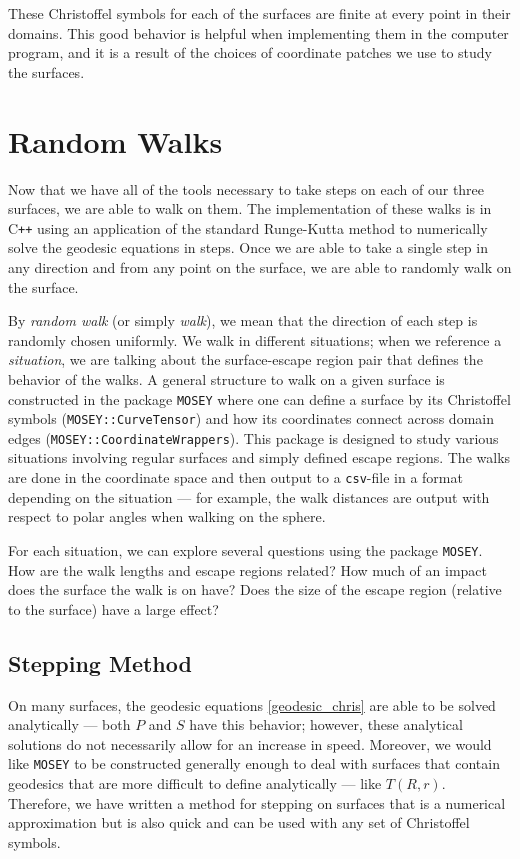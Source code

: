 \documentclass[12pt]{article}
\begin{document}
		These Christoffel symbols for each of the surfaces are finite at every point in their domains.
		This good behavior is helpful when implementing them in the computer program, and it is a result of the choices of coordinate patches we use to study the surfaces.
	
\section{Random Walks}
	Now that we have all of the tools necessary to take steps on each of our three surfaces, we are able to walk on them.
	The implementation of these walks is in C\texttt{++} using an application of the standard Runge-Kutta method to numerically solve the geodesic equations in steps.
	Once we are able to take a single step in any direction and from any point on the surface, we are able to randomly walk on the surface.
	
	By \emph{random walk} (or simply \emph{walk}), we mean that the direction of each step is randomly chosen uniformly.
	We walk in different situations; when we reference a \emph{situation}, we are talking about the surface-escape region pair that defines the behavior of the walks.
	A general structure to walk on a given surface is constructed in the package \texttt{MOSEY} where one can define a surface by its Christoffel symbols (\texttt{MOSEY::CurveTensor}) and how its coordinates connect across domain edges (\texttt{MOSEY::CoordinateWrappers}).
	This package is designed to study various situations involving regular surfaces and simply defined escape regions.
	The walks are done in the coordinate space and then output to a \texttt{csv}-file in a format depending on the situation --- for example, the walk distances are output with respect to polar angles when walking on the sphere.
	
	For each situation, we can explore several questions using the package \texttt{MOSEY}.
	How are the walk lengths and escape regions related?
	How much of an impact does the surface the walk is on have?
	Does the size of the escape region (relative to the surface) have a large effect?
	
	\subsection{Stepping Method}
		On many surfaces, the geodesic equations \ref{geodesic_chris} are able to be solved analytically --- both $P$ and $S$ have this behavior; however, these analytical solutions do not necessarily allow for an increase in speed.
		Moreover, we would like \texttt{MOSEY} to be constructed generally enough to deal with surfaces that contain geodesics that are more difficult to define analytically --- like $T(R,r)$.
		Therefore, we have written a method for stepping on surfaces that is a numerical approximation but is also quick and can be used with any set of Christoffel symbols.
		
\end{document}
